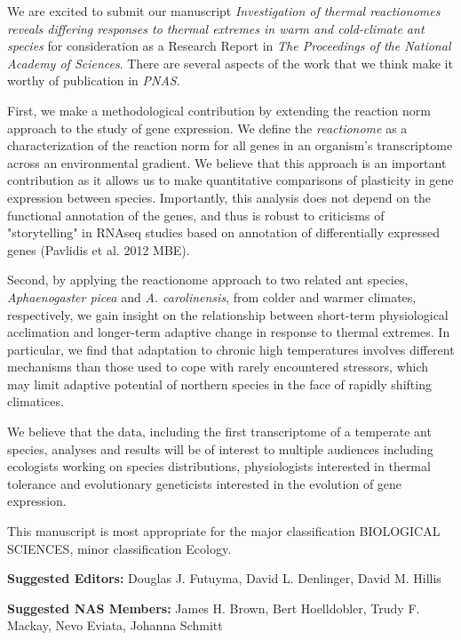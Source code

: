 \documentclass[letterpaper]{article}
\begin{document}
\thispagestyle{first}


We are excited to submit our manuscript \emph{Investigation of thermal
reactionomes reveals differing responses to thermal extremes in warm and
cold-climate ant species} for consideration as a Research Report in
\emph{The Proceedings of the National Academy of Sciences}. There are
several aspects of the work that we think make it worthy of publication
in \emph{PNAS}.

First, we make a methodological contribution by extending the reaction
norm approach to the study of gene expression. We define the
\emph{reactionome} as a characterization of the reaction norm for all
genes in an organism's transcriptome across an environmental gradient. 
We believe that this approach is an important contribution as it allows us
to make quantitative comparisons of plasticity in gene expression between
species. Importantly, this analysis does not depend on the functional 
annotation of the genes, and thus is robust to criticisms of "storytelling" 
in RNAseq studies based on annotation of differentially expressed 
genes (Pavlidis et al. 2012 MBE). 

Second, by applying the reactionome approach to two related ant species,
\emph{Aphaenogaster picea} and \emph{A. carolinensis}, from colder and
warmer climates, respectively, we gain insight on the relationship
between short-term physiological acclimation and longer-term adaptive
change in response to thermal extremes. In particular, we find that
adaptation to chronic high temperatures involves different mechanisms
than those used to cope with rarely encountered stressors, which may
limit adaptive potential of northern species in the face of rapidly
shifting climatices.

We believe that the data, including the first transcriptome of a
temperate ant species, analyses and results will be of interest to
multiple audiences including ecologists working on species
distributions, physiologists interested in thermal tolerance and
evolutionary geneticists interested in the evolution of gene expression.

This manuscript is most appropriate for the major classification
BIOLOGICAL SCIENCES, minor classification Ecology.

\textbf{Suggested Editors:} Douglas J. Futuyma, David L. Denlinger, David M. Hillis

\textbf{Suggested NAS Members:} James H. Brown, Bert Hoelldobler, Trudy F. Mackay, Nevo Eviata, Johanna Schmitt
\end{document}
